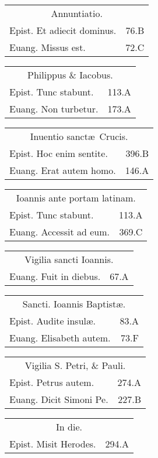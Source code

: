 \documentclass[a5paper,10pt]{book}
\def\ae{æ}
\begin{document}
\begin{multicols}{2}
\begin{tabular}{l r}
\multicolumn{2}{c}{\color{red} Annuntiatio.}\\
Epist. Et adiecit dominus. & 76.B\\
Euang. Missus est. & 72.C\\
\end{tabular}
\begin{tabular}{l r}
\multicolumn{2}{c}{\color{red} Philippus \& Iacobus.}\\
Epist. Tunc stabunt. & 113.A\\
Euang. Non turbetur. & 173.A\\
\end{tabular}
\begin{tabular}{l r}
\multicolumn{2}{c}{\color{red} Inuentio sanct\ae \ Crucis.}\\
Epist. Hoc enim sentite. & 396.B\\
Euang. Erat autem homo. & 146.A\\
\end{tabular}
\begin{tabular}{l r}
\multicolumn{2}{c}{\color{red} Ioannis ante portam latinam.}\\
Epist. Tunc stabunt. & 113.A\\
Euang. Accessit ad eum. & 369.C\\
\end{tabular}
\begin{tabular}{l r}
\multicolumn{2}{c}{\color{red} Vigilia sancti Ioannis.}\\
Euang. Fuit in diebus. & 67.A\\
\end{tabular}
\begin{tabular}{l r}
\multicolumn{2}{c}{\color{red} Sancti. Ioannis Baptist\ae .}\\
Epist. Audite insul\ae . & 83.A\\
Euang. Elisabeth autem. & 73.F\\
\end{tabular}
\begin{tabular}{l r}
\multicolumn{2}{c}{\color{red} Vigilia S. Petri, \& Pauli.}\\
Epist. Petrus autem. & 274.A\\
Euang. Dicit Simoni Pe. & 227.B\\
\end{tabular}
\begin{tabular}{l r}
\multicolumn{2}{c}{\color{red} In die.}\\
Epist. Misit Herodes. & 294.A\\

\end{tabular}
\end{multicols}
\end{document}

